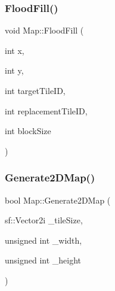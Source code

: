 \subsubsection{\texorpdfstring{Flood\+Fill()}{FloodFill()}\hspace{0.1cm}{\footnotesize\ttfamily [2/2]}}
{\footnotesize\ttfamily void Map\+::\+Flood\+Fill (\begin{DoxyParamCaption}\item[{int}]{x,  }\item[{int}]{y,  }\item[{int}]{target\+Tile\+ID,  }\item[{int}]{replacement\+Tile\+ID,  }\item[{int}]{block\+Size }\end{DoxyParamCaption})}

\mbox{\label{class_map_a6e7c6b33a4b312d325eb7079f651b414}} 
\subsubsection{\texorpdfstring{Generate2\+D\+Map()}{Generate2DMap()}}
{\footnotesize\ttfamily bool Map\+::\+Generate2\+D\+Map (\begin{DoxyParamCaption}\item[{sf\+::\+Vector2i}]{\+\_\+tile\+Size,  }\item[{unsigned int}]{\+\_\+width,  }\item[{unsigned int}]{\+\_\+height }\end{DoxyParamCaption})}

